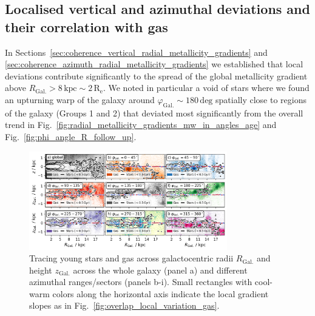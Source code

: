 \documentclass[twocolumn,apj,numberedappendix,appendixfloats]{openjournal}
\begin{document}
\begin{CJK*}{UTF8}{gbsn}
\subsection{Localised vertical and azimuthal deviations and their correlation with gas} \label{sec:discussion_coherence_position}

In Sections~\ref{sec:coherence_vertical_radial_metallicity_gradients} and \ref{sec:coherence_azimuth_radial_metallicity_gradients} we established that local deviations contribute significantly to the spread of the global metallicity gradient above $R_\mathrm{Gal.} > 8\,\mathrm{kpc} \sim 2\,\mathrm{R_e}$. We noted in particular a void of stars where we found an upturning warp of the galaxy around $\varphi_\mathrm{Gal.} \sim 180\,\mathrm{deg}$ spatially close to regions of the galaxy (Groups 1 and 2) that deviated most significantly from the overall trend in Fig.~\ref{fig:radial_metallicity_gradients_mw_in_angles_age} and Fig.~\ref{fig:phi_angle_R_follow_up}.

\begin{figure}
    \centering
    \includegraphics[width=0.77\textwidth]{figures/tracing_young_stars_and_gas_in_angles.png}
    \caption{Tracing young stars and gas across galactocentric radii $R_\mathrm{Gal.}$ and height $z_\mathrm{Gal.}$ across the whole galaxy (panel a) and different azimuthal ranges/sectors (panels b-i). Small rectangles with cool-warm colors along the horizontal axis indicate the local gradient slopes as in Fig.~\ref{fig:overlap_local_variation_gas}.}
    \label{fig:tracing_young_stars_and_gas_in_angles}
\end{figure}


\end{CJK*}
\end{document}
